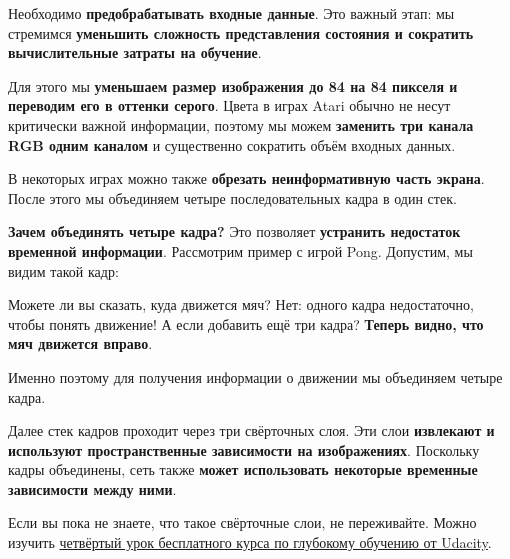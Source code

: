 \documentclass[11pt,a4paper]{article}
\begin{document}
Необходимо \textbf{предобрабатывать входные данные}. Это важный этап: мы стремимся \textbf{уменьшить сложность представления состояния и сократить вычислительные затраты на обучение}.

Для этого мы \textbf{уменьшаем размер изображения до 84 на 84 пикселя и переводим его в оттенки серого}. Цвета в играх Atari обычно не несут критически важной информации, поэтому мы можем \textbf{заменить три канала RGB одним каналом} и существенно сократить объём входных данных.

В некоторых играх можно также \textbf{обрезать неинформативную часть экрана}. После этого мы объединяем четыре последовательных кадра в один стек.


\textbf{Зачем объединять четыре кадра?} Это позволяет \textbf{устранить недостаток временной информации}. Рассмотрим пример с игрой Pong. Допустим, мы видим такой кадр:


Можете ли вы сказать, куда движется мяч? Нет: одного кадра недостаточно, чтобы понять движение! А если добавить ещё три кадра? \textbf{Теперь видно, что мяч движется вправо}.


Именно поэтому для получения информации о движении мы объединяем четыре кадра.

Далее стек кадров проходит через три свёрточных слоя. Эти слои \textbf{извлекают и используют пространственные зависимости на изображениях}. Поскольку кадры объединены, сеть также \textbf{может использовать некоторые временные зависимости между ними}.

Если вы пока не знаете, что такое свёрточные слои, не переживайте. Можно изучить \href{https://www.udacity.com/course/deep-learning-pytorch--ud188}{четвёртый урок бесплатного курса по глубокому обучению от Udacity}.
\end{document}
